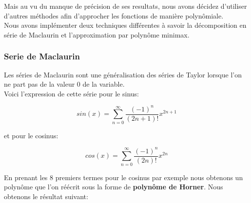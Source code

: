 \documentclass[12pt]{article}
\begin{document}
Mais au vu du manque de précision de ses resultats, nous avons décidez
d'utiliser d'autres méthodes afin d'approcher les fonctions de manière polynômiale. \\
Nous avons implémenter deux techniques différentes à savoir la décomposition en
série de Maclaurin et l'approximation par polynôme minimax.

\subsubsection{Serie de Maclaurin}
Les séries de Maclaurin sont une généralisation des séries de Taylor lorsque
l'on ne part pas de la valeur 0 de la variable.\\
Voici l'expression de cette série pour le sinus:
\begin{center}
\begin{equation}
 sin(x) = \sum_{n=0}^{\infty} \frac{(-1)^n}{(2n+1)!}x^{2n+1}
\end{equation}
\end{center}
et pour le cosinus:
\begin{center}
\begin{equation}
  cos(x) = \sum_{n=0}^{\infty} \frac{(-1)^n}{(2n)!}x^{2n}
\end{equation}
\end{center}

En prenant les 8 premiers termes pour le cosinus par exemple nous obtenons un polynôme
que l'on réécrit sous la forme de \textbf{polynôme de Horner}. Nous obtenons
le résultat suivant:
\end{document}
